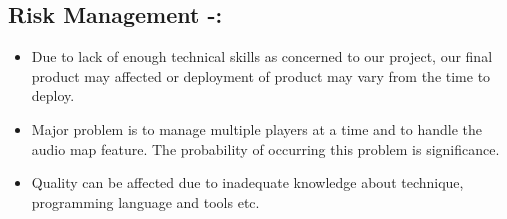 \documentclass[]{article}
\begin{document}
\subsection{Risk Management -:}
\begin{itemize}
\item Due to lack of enough technical skills as concerned to our project, our final product may
affected or deployment of product may vary from the time to deploy.
\item Major problem is to manage multiple players at a time and to handle the audio map
feature. The probability of occurring this problem is significance.
\item Quality can be affected due to inadequate knowledge about technique, programming
language and tools etc. 
\end{itemize}
% 
%
% 
%
\end{document}
